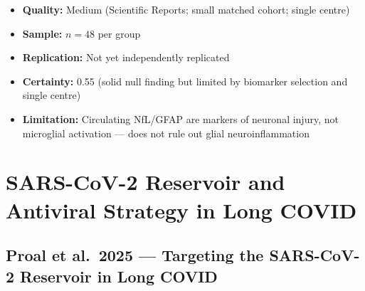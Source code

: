\begin{description}
\begin{itemize}
        \item \textbf{Quality:} Medium (Scientific Reports; small matched cohort; single centre)
        \item \textbf{Sample:} $n=48$ per group
        \item \textbf{Replication:} Not yet independently replicated
        \item \textbf{Certainty:} 0.55 (solid null finding but limited by biomarker selection and single centre)
        \item \textbf{Limitation:} Circulating NfL/GFAP are markers of neuronal injury, not microglial activation --- does not rule out glial neuroinflammation
    \end{itemize}
\end{description}

\section{SARS-CoV-2 Reservoir and Antiviral Strategy in Long COVID}
\label{sec:bib-reservoir-antiviral-2026}

\subsection{Proal et al.\ 2025 --- Targeting the SARS-CoV-2 Reservoir in Long COVID}

